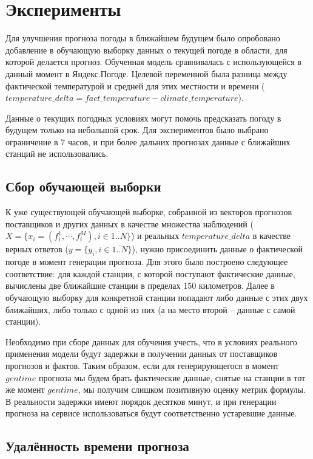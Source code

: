\documentclass[14pt]{matmex-diploma}
\begin{document}
\section{Эксперименты}

Для улучшения прогноза погоды в ближайшем будущем было опробовано добавление в обучающую выборку данных о текущей погоде в области, для которой делается прогноз. Обученная модель сравнивалась с использующейся в данный момент в Яндекс.Погоде. Целевой переменной была разница между фактической температурой и средней для этих местности и времени ($temperature\_delta = fact\_temperature - climate\_temperature$).

Данные о текущих погодных условиях могут помочь предсказать погоду в будущем только на небольшой срок. Для экспериментов было выбрано ограничение в 7 часов, и при более дальних прогнозах данные с ближайших станций не использовались.

\subsection{Сбор обучающей выборки}
К уже существующей обучающей выборке, собранной из векторов прогнозов поставщиков и других данных в качестве множества наблюдений ($X = \{x_i = (f^1_{i}, \cdots, f^M_i), i \in \overline{1..N}\}$) и реальных $temperature\_delta$ в качестве верных ответов ($y = \{y_i, i \in \overline{1..N}\}$), нужно присоединить данные о фактической погоде в момент генерации прогноза. Для этого было построено следующее соответствие: для каждой станции, с которой поступают фактические данные, вычислены две ближайшие станции в пределах 150 километров. Далее в обучающую выборку для конкретной станции попадают либо данные с этих двух ближайших, либо только с одной из них (а на место второй -- данные с самой станции). %

Необходимо при сборе данных для обучения учесть, что в условиях реального применения модели будут задержки в получении данных от поставщиков прогнозов и фактов. Таким образом, если для генерирующегося в момент $gentime$ прогноза мы будем брать фактические данные, снятые на станции в тот же момент $gentime$, мы получим слишком позитивную оценку метрик формулы. В реальности задержки имеют порядок десятков минут, и при генерации прогноза на сервисе использоваться будут соответственно устаревшие данные.




\subsection{Удалённость времени прогноза}
\end{document}
